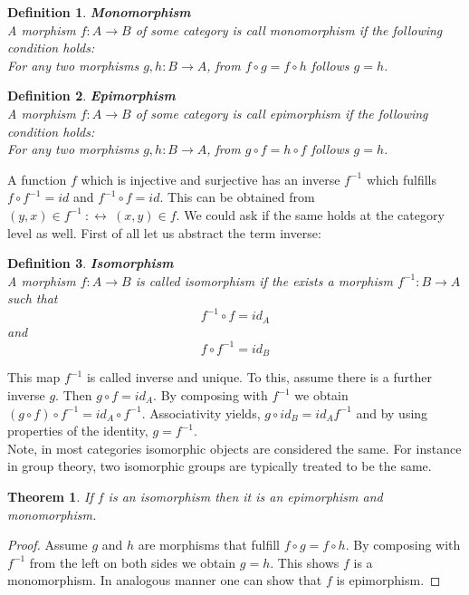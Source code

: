 \documentclass[17pt]{extarticle}
\newtheorem{theorem}{Theorem}[section]
\newtheorem{definition}{Definition}
\begin{document}
\begin{definition}
	\textbf{Monomorphism}\\
	A morphism $f:A\rightarrow B$ of some category is call monomorphism if the following condition holds:\\
	For any two morphisms $g,h:B\rightarrow A$, from $f\circ g=f\circ h$ follows $g=h$.	
\end{definition}

\begin{definition}
	\textbf{Epimorphism}\\
	A morphism $f:A\rightarrow B$ of some category is call epimorphism if the following condition holds:\\
	For any two morphisms $g,h:B\rightarrow A$, from $g\circ f=h\circ f$ follows $g=h$.	
\end{definition}

A function $f$ which is injective and surjective has an inverse $f^{-1}$ which fulfills $f\circ f^{-1}=id$ and $f^{-1}\circ f=id$. This can be obtained from $(y,x)\in f^{-1} \ :\leftrightarrow \ (x,y)\in f$. We could ask if the same holds at the category level as well.
First of all let us abstract the term inverse:

\begin{definition}
	\textbf{Isomorphism}\\
	A morphism $f:A\rightarrow B$ is called isomorphism if the exists a morphism $f^{-1}:B\rightarrow A$ such that
	$$f^{-1}\circ f=id_A$$
	and
	$$f\circ f^{-1}=id_B$$	
\end{definition}
This map $f^{-1}$ is called inverse and unique. To this, assume there is a further inverse $g$.
Then $g\circ f=id_A$. By composing with $f^{-1}$ we obtain $(g\circ f)\circ f^{-1}=id_A\circ f^{-1}$.
Associativity yields, $g\circ id_B=id_A f^{-1}$ and by using properties of the identity, $g=f^{-1}$.\\
Note, in most categories isomorphic objects are considered the same. For instance in group theory, two isomorphic groups are typically treated to be the same.

\begin{theorem}
	If $f$ is an isomorphism then it is an epimorphism and monomorphism.
\end{theorem}
\begin{proof}
	Assume $g$ and $h$ are morphisms that fulfill $f\circ g=f\circ h$. By composing with $f^{-1}$ from the left on
	both sides we obtain $g=h$. This shows $f$ is a monomorphism. In analogous manner one can show that $f$
	is epimorphism.
\end{proof}
\end{document}
